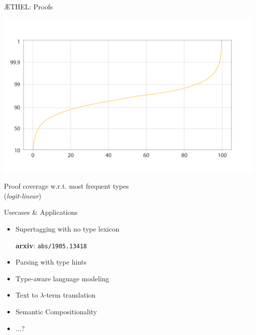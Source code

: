 \documentclass{beamer}
\begin{document}
{\begin{frame}{\AE THEL: Proofs}
	\begin{minipage}{0.75\textwidth}	\includegraphics[width=\textwidth,height=0.6\textheight,keepaspectratio]{sentence_covr3.png}\end{minipage}%
	\begin{minipage}{0.25\textwidth}
	\scriptsize{Proof coverage w.r.t. most frequent types\\
	(\textit{logit-linear})}
	\end{minipage}
	
\end{frame}
}

\begin{frame}{Usecases \& Applications}
	\begin{itemize}
	\item {Supertagging with no type lexicon\\
	\begin{flushright}
	\textbf{arxiv}: \quad \texttt{abs/1905.13418}	
	\end{flushright}
	}
	\item {Parsing with type hints}
	\item {Type-aware language modeling}
	\item {Text to $\lambda$-term translation}
	\item {Semantic Compositionality}
	\item {...?}
	\end{itemize}
\end{frame}
\end{document}
